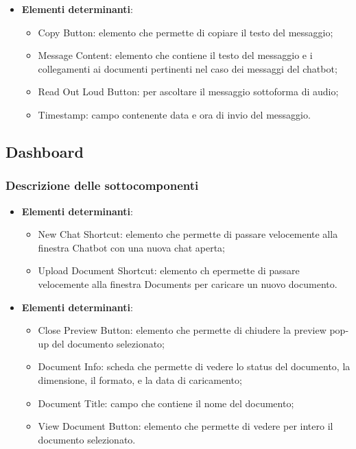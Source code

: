 \documentclass[10pt, a4paper]{article}
\begin{document}
\label{MessageCardDettaglio}
\begin{itemize}
    \item \textbf{Elementi determinanti}:
    \begin{itemize}
        \item Copy Button: elemento che permette di copiare il testo del messaggio;
        \item Message Content: elemento che contiene il testo del messaggio e i collegamenti ai documenti pertinenti nel caso dei messaggi del chatbot;
        \item Read Out Loud Button: per ascoltare il messaggio sottoforma di audio;
        \item Timestamp: campo contenente data e ora di invio del messaggio.
    \end{itemize}
\end{itemize}


\subsection{Dashboard}

\subsubsection{Descrizione delle sottocomponenti}

\label{DashboardHeaderDettaglio}
\begin{itemize}
    \item \textbf{Elementi determinanti}:
    \begin{itemize}
        \item New Chat Shortcut: elemento che permette di passare velocemente alla finestra Chatbot con una nuova chat aperta;
        \item Upload Document Shortcut: elemento ch epermette di passare velocemente alla finestra Documents per caricare un nuovo documento.   
    \end{itemize}
\end{itemize}


\label{DocumentPreviewDettaglio}
\begin{itemize}
    \item \textbf{Elementi determinanti}:
    \begin{itemize}
        \item Close Preview Button: elemento che permette di chiudere la preview pop-up del documento selezionato;
        \item Document Info: scheda che permette di vedere lo status del documento, la dimensione, il formato, e la data di caricamento;
        \item Document Title: campo che contiene il nome del documento;
        \item View Document Button: elemento che permette di vedere per intero il documento selezionato.
    \end{itemize}
\end{itemize}
\end{document}
